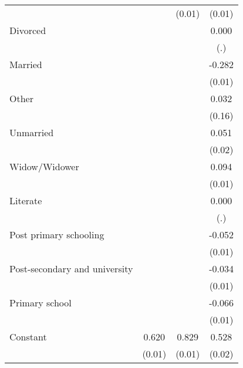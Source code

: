{\begin{tabular}{l*{3}{c}}
                    &                     &      (0.01)         &      (0.01)         \\
Divorced            &                     &                     &       0.000         \\
                    &                     &                     &         (.)         \\
Married             &                     &                     &      -0.282\sym{***}\\
                    &                     &                     &      (0.01)         \\
Other               &                     &                     &       0.032         \\
                    &                     &                     &      (0.16)         \\
Unmarried           &                     &                     &       0.051\sym{**} \\
                    &                     &                     &      (0.02)         \\
Widow/Widower       &                     &                     &       0.094\sym{***}\\
                    &                     &                     &      (0.01)         \\
Literate            &                     &                     &       0.000         \\
                    &                     &                     &         (.)         \\
Post primary schooling&                     &                     &      -0.052\sym{***}\\
                    &                     &                     &      (0.01)         \\
Post-secondary and university&                     &                     &      -0.034\sym{**} \\
                    &                     &                     &      (0.01)         \\
Primary school      &                     &                     &      -0.066\sym{***}\\
                    &                     &                     &      (0.01)         \\
Constant            &       0.620\sym{***}&       0.829\sym{***}&       0.528\sym{***}\\
                    &      (0.01)         &      (0.01)         &      (0.02)         \\

\end{tabular}}
